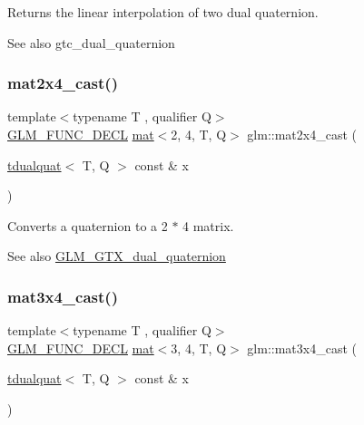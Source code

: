 Returns the linear interpolation of two dual quaternion.

\begin{DoxySeeAlso}{See also}
gtc\+\_\+dual\+\_\+quaternion 
\end{DoxySeeAlso}
\mbox{\label{group__gtx__dual__quaternion_gae99d143b37f9cad4cd9285571aab685a}} 
\subsubsection{\texorpdfstring{mat2x4\+\_\+cast()}{mat2x4\_cast()}}
{\footnotesize\ttfamily template$<$typename T , qualifier Q$>$ \\
\mbox{\hyperlink{setup_8hpp_ab2d052de21a70539923e9bcbf6e83a51}{G\+L\+M\+\_\+\+F\+U\+N\+C\+\_\+\+D\+E\+CL}} \mbox{\hyperlink{structglm_1_1mat}{mat}}$<$2, 4, T, Q$>$ glm\+::mat2x4\+\_\+cast (\begin{DoxyParamCaption}\item[{\mbox{\hyperlink{structglm_1_1tdualquat}{tdualquat}}$<$ T, Q $>$ const \&}]{x }\end{DoxyParamCaption})}

Converts a quaternion to a 2 $\ast$ 4 matrix.

\begin{DoxySeeAlso}{See also}
\mbox{\hyperlink{group__gtx__dual__quaternion}{G\+L\+M\+\_\+\+G\+T\+X\+\_\+dual\+\_\+quaternion}} 
\end{DoxySeeAlso}
\mbox{\label{group__gtx__dual__quaternion_gaf59f5bb69620d2891c3795c6f2639179}} 
\subsubsection{\texorpdfstring{mat3x4\+\_\+cast()}{mat3x4\_cast()}}
{\footnotesize\ttfamily template$<$typename T , qualifier Q$>$ \\
\mbox{\hyperlink{setup_8hpp_ab2d052de21a70539923e9bcbf6e83a51}{G\+L\+M\+\_\+\+F\+U\+N\+C\+\_\+\+D\+E\+CL}} \mbox{\hyperlink{structglm_1_1mat}{mat}}$<$3, 4, T, Q$>$ glm\+::mat3x4\+\_\+cast (\begin{DoxyParamCaption}\item[{\mbox{\hyperlink{structglm_1_1tdualquat}{tdualquat}}$<$ T, Q $>$ const \&}]{x }\end{DoxyParamCaption})}

